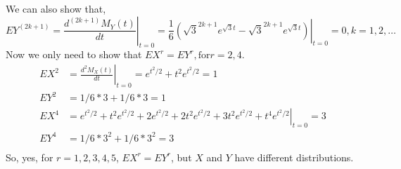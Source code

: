 \documentclass[letter]{article}
\newcommand{\mgf}{M_X(t)}
\begin{document}
    We can also show that,
    \[ 
    EY^(2k+1) = \left. \frac{d^{(2k+1)} M_Y(t)}{dt}\right|_{t=0} = 
    \left.\frac{1}{6}\left(\sqrt{3}^{2k+1}e^{\sqrt{3}t}-\sqrt{3}^{2k+1}e^{\sqrt{3}t}\right) \right|_{t=0} = 0, k = 1, 2, \dots \]
    Now we only need to show that $EX^r = EY^r, \text{for} r = 2,4$.
    \begin{align*}
    EX^2 & = \left. \frac{d^2 \mgf}{dt} \right|_{t=0} = e^{t^2/2} + t^2 e^{t^2/2} = 1 \\
    EY^2 & = 1/6 * 3 + 1/6 * 3 = 1 \\
    EX^4 & = \left. e^{t^2/2} + t^2e^{t^2/2} + 2e^{t^2/2} + 2t^2e^{t^2/2} + 3t^2e^{t^2/2} + t^4e^{t^2/2} \right|_{t=0} = 3 \\
    EY^4 & = 1/6 * 3^2 + 1/6 * 3^2 = 3 \\
    \end{align*}
    So, yes, for $r=1,2,3,4,5$, $EX^r = EY^r$, but $X$ and $Y$ have different distributions.
    
\end{document}
